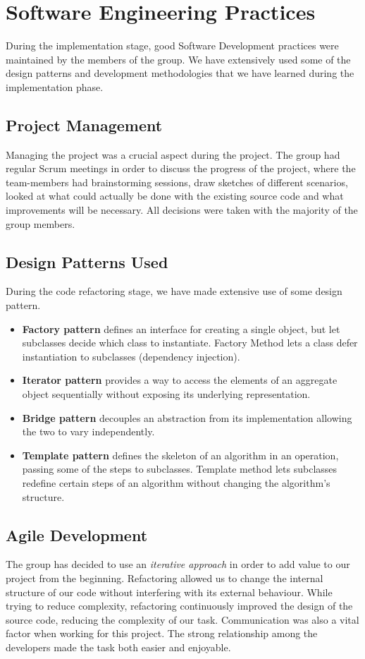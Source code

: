 \documentclass[11pt,twocolumn]{article} %
\begin{document}
\section{Software Engineering Practices}
During the implementation stage, good Software Development practices were maintained by the members of the group. We have extensively used some of the design patterns and development methodologies that we have learned during the implementation phase.

\subsection{Project Management}
Managing the project was a crucial aspect during the project. The group had regular Scrum meetings in order to discuss the 
progress of the project, where the team-members had brainstorming sessions, draw sketches of different scenarios, looked at
what could actually be done with the existing source code and what improvements will be necessary. All decisions were taken
with the majority of the group members.

\subsection{Design Patterns Used}
During the code refactoring stage, we have made extensive use of some design pattern.
\begin{itemize}
\item{{\bf Factory pattern} defines an interface for creating a single object, but let subclasses decide which class to instantiate. Factory Method lets a class defer instantiation to subclasses (dependency injection).}
\item{{\bf Iterator pattern} provides a way to access the elements of an aggregate object sequentially without exposing its underlying representation.}
\item{{\bf Bridge pattern} decouples an abstraction from its implementation allowing the two to vary independently.}
\item{{\bf Template pattern} defines the skeleton of an algorithm in an operation, passing some of the steps to subclasses.
Template method lets subclasses redefine certain steps of an algorithm without changing the algorithm's structure.}
\end{itemize}


\subsection{Agile Development}
The group has decided to use an \emph{iterative approach} in order to add value to our project from the beginning. 
Refactoring allowed us to change the internal structure of our code without interfering with its external behaviour. While trying to reduce complexity, refactoring continuously improved the design of the source code, reducing the complexity of our task.
Communication was also a vital factor when working for this project. The strong relationship among the developers made the task both 
easier and enjoyable.
\end{document}
